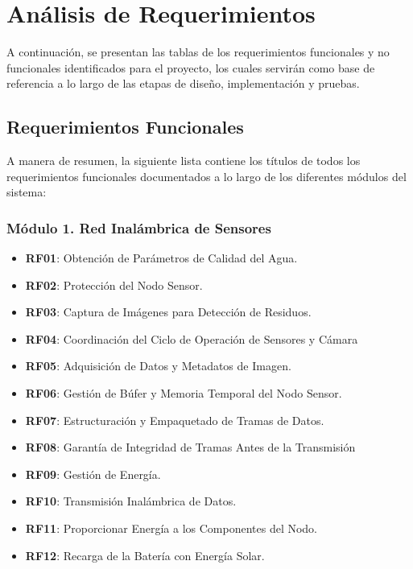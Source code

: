 


\makeatletter
\newcommand{\RF}[1][]{%
  \refstepcounter{RF}%
  RF\@tempcnta=\value{RF}%
  \ifnum\@tempcnta<10 0\fi%
  \arabic{RF}%
  \if\relax#1\relax\else\label{#1}\fi%
}
\makeatother

\section{Análisis de Requerimientos}
A continuación, se presentan las tablas de los requerimientos funcionales y no funcionales identificados para el proyecto, los cuales servirán como base de referencia a lo largo de las etapas de diseño, implementación y pruebas.
\subsection{Requerimientos Funcionales}
A manera de resumen, la siguiente lista contiene los títulos de todos los requerimientos funcionales documentados a lo largo de los diferentes módulos del sistema:

\subsubsection*{Módulo 1. Red Inalámbrica de Sensores}
\begin{itemize}
    \item \textbf{RF01}: Obtención de Parámetros de Calidad del Agua.
    \item \textbf{RF02}: Protección del Nodo Sensor.
    \item \textbf{RF03}: Captura de Imágenes para Detección de Residuos.
    \item \textbf{RF04}: Coordinación del Ciclo de Operación de Sensores y Cámara
    \item \textbf{RF05}: Adquisición de Datos y Metadatos de Imagen.
    \item \textbf{RF06}: Gestión de Búfer y Memoria Temporal del Nodo Sensor.
    \item \textbf{RF07}: Estructuración y Empaquetado de Tramas de Datos.
    \item \textbf{RF08}: Garantía de Integridad de Tramas Antes de la Transmisión
    \item \textbf{RF09}: Gestión de Energía.
    \item \textbf{RF10}: Transmisión Inalámbrica de Datos.
    \item \textbf{RF11}: Proporcionar Energía a los Componentes del Nodo.
    \item \textbf{RF12}: Recarga de la Batería con Energía Solar.
\end{itemize}

